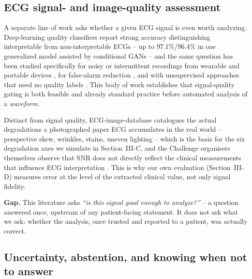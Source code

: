 \documentclass[conference]{IEEEtran}
\begin{document}
\subsection{ECG signal- and image-quality assessment}

A separate line of work asks whether a given ECG signal is even worth analyzing.
Deep-learning quality classifiers report strong accuracy distinguishing
interpretable from non-interpretable ECGs -- up to 97.1\%/96.4\% in one generalized
model assisted by conditional GANs \cite{ref12} -- and the same question has been
studied specifically for noisy or intermittent recordings from wearable and portable
devices \cite{ref13,ref15,ref16,ref19,ref20}, for false-alarm reduction \cite{ref17,ref18},
and with unsupervised approaches that need no quality labels \cite{ref14,ref21}. This body of
work establishes that signal-quality gating is both feasible and already standard
practice before automated analysis of a \emph{waveform}.

Distinct from signal quality, ECG-image-database \cite{ref4} catalogues the
actual degradations a photographed paper ECG accumulates in the real world --
perspective skew, wrinkles, stains, uneven lighting -- which is the basis for the six
degradation axes we simulate in Section~III-C, and the Challenge organisers
themselves observe that SNR does not directly reflect the clinical measurements
that influence ECG interpretation \cite{ref2}. This is why our own evaluation
(Section~III-D) measures error at the level of the extracted clinical value, not only
signal fidelity.

\textbf{Gap.} This literature asks \emph{``is this signal good enough to analyze?''}
-- a question answered once, upstream of any patient-facing statement. It does not
ask what we ask: whether the analysis, once trusted and reported to a patient, was
actually correct.

\subsection{Uncertainty, abstention, and knowing when not to answer}
\end{document}
